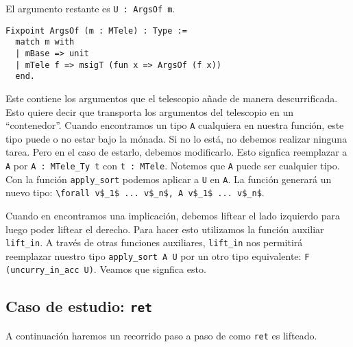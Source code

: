 El argumento restante es \lstinline{U : ArgsOf m}.

\begin{lstlisting}[frame=tb,caption={Definición de \lstinline{ArgsOf}},label=lst:ArgsOf]
Fixpoint ArgsOf (m : MTele) : Type :=
  match m with
  | mBase => unit
  | mTele f => msigT (fun x => ArgsOf (f x))
  end.
\end{lstlisting}

Este contiene los argumentos que el telescopio añade de manera descurrificada.
Esto quiere decir que transporta los argumentos del telescopio en un ``contenedor''.
Cuando encontramos un tipo \lstinline{A} cualquiera en nuestra función, este tipo puede o no estar bajo la mónada.
Si no lo está, no debemos realizar ninguna tarea.
Pero en el caso de estarlo, debemos modificarlo. Esto signfica reemplazar a \lstinline{A} por \lstinline{A : MTele_Ty t} con \lstinline{t : MTele}.
Notemos que \lstinline{A} puede ser cualquier tipo.
Con la función \lstinline{apply_sort} podemos aplicar a \lstinline{U} en \lstinline{A}. La función generará un nuevo tipo: \lstinline{\forall v$_1$ ... v$_n$, A v$_1$ ... v$_n$}.

Cuando en \lift encontramos una implicación, debemos liftear el lado izquierdo para luego poder liftear el derecho.
Para hacer esto utilizamos la función auxiliar \lstinline{lift_in}.
A través de otras funciones auxiliares, \lstinline{lift_in} nos permitirá reemplazar nuestro tipo \lstinline{apply_sort A U} por un otro tipo equivalente: \lstinline{F (uncurry_in_acc U)}. Veamos que signfica esto.



\subsection{Caso de estudio: \texttt{ret}}

A continuación haremos un recorrido paso a paso de como \lstinline{ret} es lifteado.

